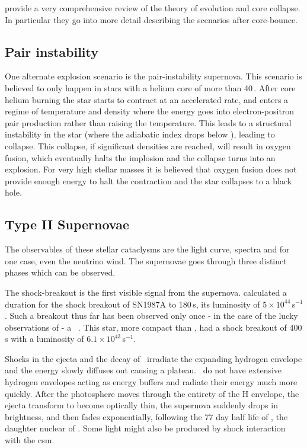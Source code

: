  \citet{2002RvMP...74.1015W} provide a very comprehensive review of the theory of evolution and core collapse. In particular they go into more detail describing the scenarios after core-bounce.

\subsection{Pair instability}
One alternate explosion scenario is the pair-instability supernova. This scenario is believed to only happen in stars with a helium core of more than 40\,\msun. After core helium burning the star starts to contract at an accelerated rate, and enters a regime of temperature and density where the energy goes into electron-positron pair production rather than raising the temperature. This leads to a structural instability in the star (where the adiabatic index drops below ), leading to collapse. This collapse, if significant densities are reached, will result in oxygen fusion, which eventually halts the implosion and the collapse turns into an explosion. For very high stellar masses it is believed that oxygen fusion does not provide enough energy to halt the contraction and the star collapses to a black hole.


\subsection{Type II Supernovae}
The observables of these stellar cataclysms are the light curve, spectra and for one case, even the neutrino wind. The supernovae goes through three distinct phases which can be observed. 

The shock-breakout is the first visible signal from the supernova.  \cite{1992ApJ...393..742E} calculated a duration for the  shock breakout of SN1987A to 180\,s, its  luminosity of $5\times10^{44}$\erg\,s$^{-1}$. 
Such a breakout thus far has been observed only once - in the case of the lucky observations of  - a \snibc\ \citep{2008Natur.453..469S}. This star, more compact than , had a shock breakout of 400\,s with a luminosity of $6.1\times10^{43}$\erg\,s$^{-1}$.

Shocks in the ejecta and the decay of \Ni\ irradiate the expanding hydrogen envelope and the energy slowly diffuses out causing a plateau. \sniil\ do not have extensive hydrogen envelopes acting as energy buffers and radiate their energy much more quickly. After the photosphere moves through the entirety of the H envelope, the ejecta transform to become optically thin, the supernova suddenly drops in brightness, and then fades exponentially, following the 77 day half life of \Co, the daughter nuclear of \Ni. Some light might also be produced by shock interaction with the \gls{csm}.





